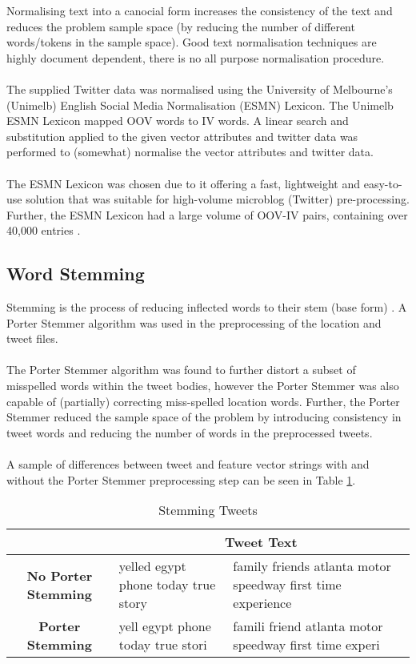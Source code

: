 \documentclass[11pt]{article}
\begin{document}
Normalising text into a canocial form increases the consistency of the text and reduces the problem sample space (by reducing the number of different words/tokens in the sample space). Good text normalisation techniques are highly document dependent, there is no all purpose normalisation procedure.\\\\
The supplied Twitter data was normalised using the University of Melbourne's (Unimelb) English Social Media Normalisation (ESMN) Lexicon. The Unimelb ESMN Lexicon mapped OOV words to IV words. A linear search and substitution applied to the given vector attributes and twitter data was performed to (somewhat) normalise the vector attributes and twitter data.\\\\
The ESMN Lexicon was chosen due to it offering a fast, lightweight and easy-to-use solution that was suitable for high-volume microblog (Twitter) pre-processing. Further, the ESMN Lexicon had a large volume of OOV-IV pairs, containing over 40,000 entries \citep{bald-ESMNL}. 

\subsection{Word Stemming}
\label{subsec:stem}

Stemming is the process of reducing inflected words to their stem (base form) \citep{pm-stem}. A Porter Stemmer \cite{pm-stem} algorithm was used in the preprocessing of the location and tweet files. \\\\
The Porter Stemmer algorithm was found to further distort a subset of misspelled words within the tweet bodies, however the Porter Stemmer was also capable of (partially) correcting miss-spelled location words. Further, the Porter Stemmer reduced the sample space of the problem by introducing consistency in tweet words and reducing the number of words in the preprocessed tweets.\\\\
A sample of differences between tweet and feature vector strings with and without the Porter Stemmer preprocessing step can be seen in Table \ref{table:stem-tweet}.
   
\begin{table} [ht]
\caption{Stemming Tweets}
\begin{center}
	\begin{tabular}{| c | p{6cm} | p{6cm} |}
	\hline
	  & \multicolumn{2}{|c|}{\textbf{Tweet Text}}\\
	\hline
	\textbf{No Porter Stemming} & yelled egypt phone today true story & family friends atlanta motor speedway first time experience\\
	\hline
	\textbf{Porter Stemming}  & yell egypt phone today true stori & famili friend atlanta motor speedway first time experi \\
	\hline
	\end{tabular}
\end{center}
\label{table:stem-tweet}
\end{table}
\end{document}
